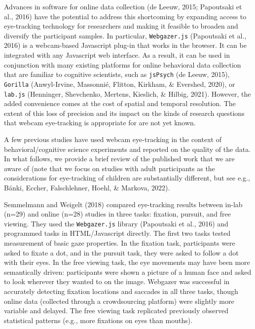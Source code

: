 \documentclass[
  man,floatsintext]{apa6}
\begin{document}
Advances in software for online data collection (de Leeuw, 2015; Papoutsaki et al., 2016) have the potential to address this shortcoming by expanding access to eye-tracking technology for researchers and making it feasible to broaden and diversify the participant samples. In particular, \texttt{Webgazer.js} (Papoutsaki et al., 2016) is a webcam-based Javascript plug-in that works in the browser. It can be integrated with any Javascript web interface. As a result, it can be used in conjunction with many existing platforms for online behavioral data collection that are familiar to cognitive scientists, such as \texttt{jsPsych} (de Leeuw, 2015), \texttt{Gorilla} (Anwyl-Irvine, Massonnié, Flitton, Kirkham, \& Evershed, 2020), or \texttt{lab.js} (Henninger, Shevchenko, Mertens, Kieslich, \& Hilbig, 2021). However, the added convenience comes at the cost of spatial and temporal resolution. The extent of this loss of precision and its impact on the kinds of research questions that webcam eye-tracking is appropriate for are not yet known.

A few previous studies have used webcam eye-tracking in the context of behavioral/cognitive science experiments and reported on the quality of the data. In what follows, we provide a brief review of the published work that we are aware of (note that we focus on studies with adult participants as the considerations for eye-tracking of children are substantially different, but see e.g., Bánki, Eccher, Falschlehner, Hoehl, \& Markova, 2022).

Semmelmann and Weigelt (2018) compared eye-tracking results between in-lab (n=29) and online (n=28) studies in three tasks: fixation, pursuit, and free viewing. They used the \texttt{Webgazer.js} library (Papoutsaki et al., 2016) and programmed tasks in HTML/Javascript directly. The first two tasks tested measurement of basic gaze properties. In the fixation task, participants were asked to fixate a dot, and in the pursuit task, they were asked to follow a dot with their eyes. In the free viewing task, the eye movements may have been more semantically driven: participants were shown a picture of a human face and asked to look wherever they wanted to on the image. Webgazer was successful in accurately detecting fixation locations and saccades in all three tasks, though online data (collected through a crowdsourcing platform) were slightly more variable and delayed. The free viewing task replicated previously observed statistical patterns (e.g., more fixations on eyes than mouths).
\end{document}
